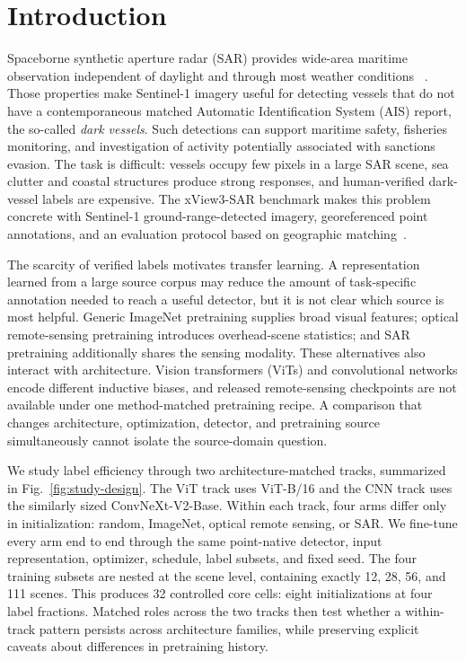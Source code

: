 \section{Introduction}
\label{sec:introduction}

Spaceborne synthetic aperture radar (SAR) provides wide-area maritime
observation independent of daylight and through most weather conditions
~\cite{torres2012sentinel1}.
Those properties make Sentinel-1 imagery useful for detecting vessels that do
not have a contemporaneous matched Automatic Identification System (AIS)
report, the so-called \emph{dark vessels}. Such detections can support
maritime safety, fisheries monitoring, and investigation of activity
potentially associated with sanctions evasion. The task is difficult: vessels
occupy few pixels in a large SAR scene, sea clutter and coastal structures
produce strong responses, and human-verified dark-vessel labels are expensive.
The xView3-SAR benchmark makes this problem concrete with Sentinel-1
ground-range-detected imagery, georeferenced point annotations, and an
evaluation protocol based on geographic matching~\cite{paolo2022xview3}.

The scarcity of verified labels motivates transfer learning. A representation
learned from a large source corpus may reduce the amount of task-specific
annotation needed to reach a useful detector, but it is not clear which source
is most helpful. Generic ImageNet pretraining supplies broad visual features;
optical remote-sensing pretraining introduces overhead-scene statistics; and
SAR pretraining additionally shares the sensing modality. These alternatives
also interact with architecture. Vision transformers (ViTs) and convolutional
networks encode different inductive biases, and released remote-sensing
checkpoints are not available under one method-matched pretraining recipe. A
comparison that changes architecture, optimization, detector, and pretraining
source simultaneously cannot isolate the source-domain question.

We study label efficiency through two architecture-matched tracks, summarized
in Fig.~\ref{fig:study-design}. The ViT track uses ViT-B/16 and the CNN track
uses the similarly sized ConvNeXt-V2-Base. Within each track, four arms differ
only in initialization: random, ImageNet, optical remote sensing, or SAR.
We fine-tune every arm end to end through the same point-native detector,
input representation, optimizer, schedule, label subsets, and fixed seed. The
four training subsets are nested at the scene level, containing exactly 12,
28, 56, and 111 scenes. This produces 32 controlled core cells: eight
initializations at four label fractions. Matched roles across the two tracks
then test whether a within-track pattern persists across architecture
families, while preserving explicit caveats about differences in pretraining
history.

